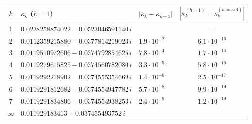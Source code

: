 \begin{tabular}{@{}cllc@{}}
\toprule
$k$ & $\kappa_k$ ($h=1$) & $|\kappa_k-\kappa_{k-1}|$ & $|\kappa_k^{(h=1)}-\kappa_k^{(h=5/4)}|$ \\
\midrule
1 & $0.0238258874022 - 0.0523046591140\,i$ &  & --- \\
2 & $0.0112359215880 - 0.0377814219023\,i$ & $1.9\cdot10^{-2}$ & $6.1\cdot10^{-16}$ \\
3 & $0.0119510972606 - 0.0374792854625\,i$ & $7.8\cdot10^{-4}$ & $1.7\cdot10^{-14}$ \\
4 & $0.0119279615825 - 0.0374560782080\,i$ & $3.3\cdot10^{-5}$ & $5.8\cdot10^{-16}$ \\
5 & $0.0119292218902 - 0.0374555354669\,i$ & $1.4\cdot10^{-6}$ & $2.5\cdot10^{-17}$ \\
6 & $0.0119291812682 - 0.0374554947782\,i$ & $5.7\cdot10^{-8}$ & $9.9\cdot10^{-19}$ \\
7 & $0.0119291834806 - 0.0374554938253\,i$ & $2.4\cdot10^{-9}$ & $1.2\cdot10^{-19}$ \\
\midrule
$\infty$ & $0.011929183413 - 0.037455493752\,i$ & & \\
\bottomrule
\end{tabular}
